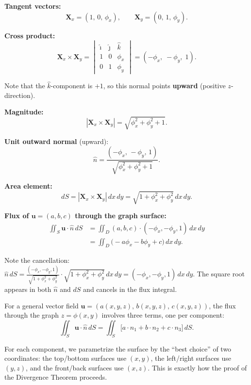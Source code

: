 \documentclass[11pt]{report}
\begin{document}
\textbf{Tangent vectors:}
\[
\mathbf{X}_x = \left(1, \, 0, \, \phi_x\right), \qquad \mathbf{X}_y = \left(0, \, 1, \, \phi_y\right).
\]

\textbf{Cross product:}
\[
\mathbf{X}_x \times \mathbf{X}_y = \begin{vmatrix} \hat{\imath} & \hat{\jmath} & \hat{k} \\ 1 & 0 & \phi_x \\ 0 & 1 & \phi_y \end{vmatrix} = (-\phi_x, \; -\phi_y, \; 1).
\]

Note that the $\hat{k}$-component is $+1$, so this normal points \textbf{upward} (positive $z$-direction).

\textbf{Magnitude:}
\[
|\mathbf{X}_x \times \mathbf{X}_y| = \sqrt{\phi_x^2 + \phi_y^2 + 1}.
\]

\textbf{Unit outward normal} (upward):
\[
\hat{n} = \frac{(-\phi_x, \, -\phi_y, \, 1)}{\sqrt{\phi_x^2 + \phi_y^2 + 1}}.
\]

\textbf{Area element:}
\[
dS = |\mathbf{X}_x \times \mathbf{X}_y| \, dx \, dy = \sqrt{1 + \phi_x^2 + \phi_y^2} \, dx \, dy.
\]

\textbf{Flux of $\mathbf{u} = (a, b, c)$ through the graph surface:}
\begin{align*}
\iint_S \mathbf{u} \cdot \hat{n} \, dS &= \iint_D (a, b, c) \cdot (-\phi_x, -\phi_y, 1) \, dx \, dy \\
&= \iint_D \big( -a\phi_x - b\phi_y + c \big) \, dx \, dy.
\end{align*}

Note the cancellation: $\hat{n} \, dS = \frac{(-\phi_x, -\phi_y, 1)}{\sqrt{1+\phi_x^2+\phi_y^2}} \cdot \sqrt{1+\phi_x^2+\phi_y^2} \, dx \, dy = (-\phi_x, -\phi_y, 1) \, dx \, dy$. The square root appears in both $\hat{n}$ and $dS$ and cancels in the flux integral.

\begin{remark}
For a general vector field $\mathbf{u} = (a(x,y,z), \, b(x,y,z), \, c(x,y,z))$, the flux through the graph $z = \phi(x,y)$ involves three terms, one per component:
\[
\iint_S \mathbf{u} \cdot \hat{n} \, dS = \iint_S \big[ a \cdot n_1 + b \cdot n_2 + c \cdot n_3 \big] \, dS.
\]

For each component, we parametrize the surface by the ``best choice'' of two coordinates: the top/bottom surfaces use $(x,y)$, the left/right surfaces use $(y,z)$, and the front/back surfaces use $(x,z)$. This is exactly how the proof of the Divergence Theorem proceeds.
\end{remark}
\end{document}
